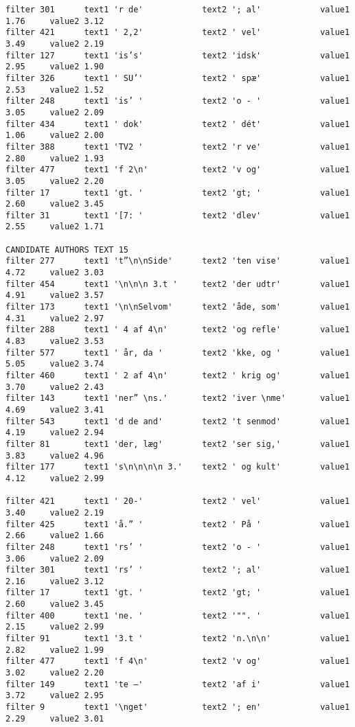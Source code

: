 {\begin{verbatim}
filter 301      text1 'r de'            text2 '; al'            value1 1.76     value2 3.12
filter 421      text1 ' 2,2'            text2 ' vel'            value1 3.49     value2 2.19
filter 127      text1 'is’s'            text2 'idsk'            value1 2.95     value2 1.90
filter 326      text1 ' SU’'            text2 ' spæ'            value1 2.53     value2 1.52
filter 248      text1 'is’ '            text2 'o - '            value1 3.05     value2 2.09
filter 434      text1 ' dok'            text2 ' dét'            value1 1.06     value2 2.00
filter 388      text1 'TV2 '            text2 'r ve'            value1 2.80     value2 1.93
filter 477      text1 'f 2\n'           text2 'v og'            value1 3.05     value2 2.20
filter 17       text1 'gt. '            text2 'gt; '            value1 2.60     value2 3.45
filter 31       text1 '[7: '            text2 'dlev'            value1 2.55     value2 1.71

CANDIDATE AUTHORS TEXT 15
filter 277      text1 't”\n\nSide'      text2 'ten vise'        value1 4.72     value2 3.03
filter 454      text1 '\n\n\n 3.t '     text2 'der udtr'        value1 4.91     value2 3.57
filter 173      text1 '\n\nSelvom'      text2 'åde, som'        value1 4.31     value2 2.97
filter 288      text1 ' 4 af 4\n'       text2 'og refle'        value1 4.83     value2 3.53
filter 577      text1 ' år, da '        text2 'kke, og '        value1 5.05     value2 3.74
filter 460      text1 ' 2 af 4\n'       text2 ' krig og'        value1 3.70     value2 2.43
filter 143      text1 'ner” \ns.'       text2 'iver \nme'       value1 4.69     value2 3.41
filter 543      text1 'd de and'        text2 't senmod'        value1 4.19     value2 2.94
filter 81       text1 'der, læg'        text2 'ser sig,'        value1 3.83     value2 4.96
filter 177      text1 's\n\n\n\n 3.'    text2 ' og kult'        value1 4.12     value2 2.99

filter 421      text1 ' 20-'            text2 ' vel'            value1 3.40     value2 2.19
filter 425      text1 'å.” '            text2 ' På '            value1 2.66     value2 1.66
filter 248      text1 'rs’ '            text2 'o - '            value1 3.06     value2 2.09
filter 301      text1 'rs’ '            text2 '; al'            value1 2.16     value2 3.12
filter 17       text1 'gt. '            text2 'gt; '            value1 2.60     value2 3.45
filter 400      text1 'ne. '            text2 '"". '            value1 2.15     value2 2.99
filter 91       text1 '3.t '            text2 'n.\n\n'          value1 2.82     value2 1.99
filter 477      text1 'f 4\n'           text2 'v og'            value1 3.02     value2 2.20
filter 149      text1 'te –'            text2 'af i'            value1 3.72     value2 2.95
filter 9        text1 '\nget'           text2 '; en'            value1 2.29     value2 3.01


\end{verbatim}}

